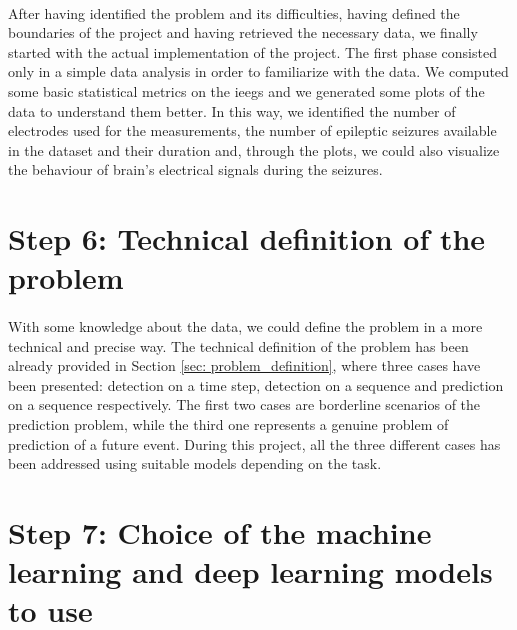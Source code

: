 \paragraph{} After having identified the problem and its difficulties, having defined the boundaries of the project and having retrieved the necessary data, we finally started with the actual implementation of the project. The first phase consisted only in a simple data analysis in order to familiarize with the data. We computed some basic statistical metrics on the \acsp{ieeg} and we generated some plots of the data to understand them better. In this way, we identified the number of electrodes used for the measurements, the number of epileptic seizures available in the dataset and their duration and, through the plots, we could also visualize the behaviour of brain's electrical signals during the seizures.


\section{Step 6: Technical definition of the problem} \label{sec: step_technical_definition_problem}
\paragraph{} With some knowledge about the data, we could define the problem in a more technical and precise way. The technical definition of the problem has been already provided in Section \ref{sec: problem_definition}, where three cases have been presented: detection on a time step, detection on a sequence and prediction on a sequence respectively. The first two cases are borderline scenarios of the prediction problem, while the third one represents a genuine problem of prediction of a future event. During this project, all the three different cases has been addressed using suitable models depending on the task.


\section{Step 7: Choice of the machine learning and deep learning models to use} \label{sec: step_choice_models_to_use}
